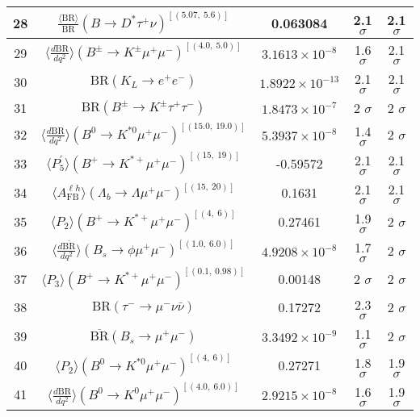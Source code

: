 \begin{longtable}{|c|c|c|c|c|}
28 &	 $\frac{\langle \mathrm{BR} \rangle}{\mathrm{BR}}(B\to D^\ast\tau^+\nu)^{[(5.07,\  5.6)]}$ &	 0.063084 &	 \cellcolor{green!0} 2.1 $ \sigma$ &	 2.1 $ \sigma$ \\ \hline
29 &	 $\langle \frac{d\mathrm{BR}}{dq^2} \rangle(B^\pm\to K^\pm \mu^+\mu^-)^{[(4.0,\  5.0)]}$ &	 $3.1613\times 10^{-8}$ &	 \cellcolor{green!25} 1.6 $ \sigma$ &	 2.1 $ \sigma$ \\ \hline
30 &	 $\mathrm{BR}(K_L\to e^+e^-)$ &	 $1.8922\times 10^{-13}$ &	 \cellcolor{red!0} 2.1 $ \sigma$ &	 2.1 $ \sigma$ \\ \hline
31 &	 $\mathrm{BR}(B^\pm\to K^\pm \tau^+\tau^-)$ &	 $1.8473\times 10^{-7}$ &	 \cellcolor{green!0} 2 $ \sigma$ &	 2 $ \sigma$ \\ \hline
32 &	 $\langle \frac{d\mathrm{BR}}{dq^2} \rangle(B^0\to K^{\ast 0}\mu^+\mu^-)^{[(15.0,\  19.0)]}$ &	 $5.3937\times 10^{-8}$ &	 \cellcolor{green!34} 1.4 $ \sigma$ &	 2 $ \sigma$ \\ \hline
33 &	 $\langle P_5^\prime\rangle(B^+\to K^{\ast +}\mu^+\mu^-)^{[(15,\  19)]}$ &	 -0.59572 &	 \cellcolor{green!0} 2.1 $ \sigma$ &	 2.1 $ \sigma$ \\ \hline
34 &	 $\langle A_\mathrm{FB}^{\ell h}\rangle(\Lambda_b\to\Lambda \mu^+\mu^-)^{[(15,\  20)]}$ &	 0.1631 &	 \cellcolor{red!0} 2.1 $ \sigma$ &	 2.1 $ \sigma$ \\ \hline
35 &	 $\langle P_2\rangle(B^+\to K^{\ast +}\mu^+\mu^-)^{[(4,\  6)]}$ &	 0.27461 &	 \cellcolor{green!4} 1.9 $ \sigma$ &	 2 $ \sigma$ \\ \hline
36 &	 $\langle \frac{d\overline{\mathrm{BR}}}{dq^2} \rangle(B_s\to \phi \mu^+\mu^-)^{[(1.0,\  6.0)]}$ &	 $4.9208\times 10^{-8}$ &	 \cellcolor{green!13} 1.7 $ \sigma$ &	 2 $ \sigma$ \\ \hline
37 &	 $\langle P_3\rangle(B^+\to K^{\ast +}\mu^+\mu^-)^{[(0.1,\  0.98)]}$ &	 0.00148 &	 \cellcolor{green!0} 2 $ \sigma$ &	 2 $ \sigma$ \\ \hline
38 &	 $\mathrm{BR}(\tau^-\to \mu^- \nu\bar\nu)$ &	 0.17272 &	 \cellcolor{red!16} 2.3 $ \sigma$ &	 2 $ \sigma$ \\ \hline
39 &	 $\overline{\mathrm{BR}}(B_s\to \mu^+\mu^-)$ &	 $3.3492\times 10^{-9}$ &	 \cellcolor{green!42} 1.1 $ \sigma$ &	 2 $ \sigma$ \\ \hline
40 &	 $\langle P_2\rangle(B^0\to K^{\ast 0}\mu^+\mu^-)^{[(4,\  6)]}$ &	 0.27271 &	 \cellcolor{green!9} 1.8 $ \sigma$ &	 1.9 $ \sigma$ \\ \hline
41 &	 $\langle \frac{d\mathrm{BR}}{dq^2} \rangle(B^0\to K^0\mu^+\mu^-)^{[(4.0,\  6.0)]}$ &	 $2.9215\times 10^{-8}$ &	 \cellcolor{green!19} 1.6 $ \sigma$ &	 1.9 $ \sigma$ \\ \hline

\end{longtable}
